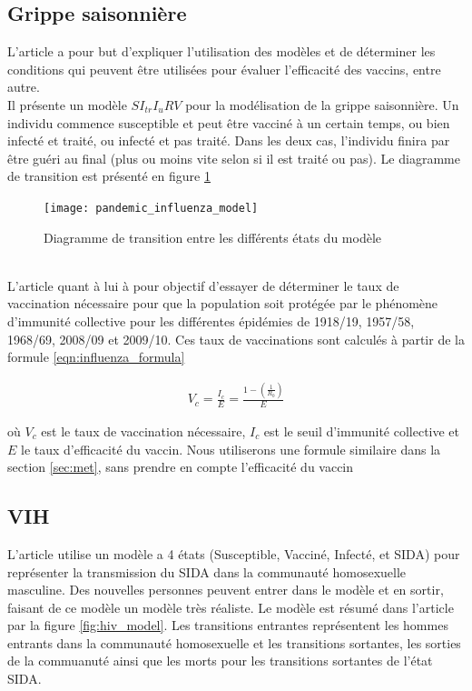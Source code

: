 \documentclass[journal, a4paper]{IEEEtran}
\begin{document}
	\subsection{Grippe saisonnière}
		L'article \cite{pandemic_influenza} a pour but d'expliquer l'utilisation des modèles et de déterminer les conditions qui peuvent être utilisées pour évaluer l'efficacité des vaccins, entre autre. \\
		Il présente un modèle $SI_{tr}I_uRV$ pour la modélisation de la grippe saisonnière. Un individu commence susceptible et peut être vacciné à un certain temps, ou bien infecté et traité, ou infecté et pas traité. Dans les deux cas, l'individu finira par être guéri au final (plus ou moins vite selon si il est traité ou pas). Le diagramme de transition est présenté en figure \ref{fig:pandemic_influenza_model}
		\begin{figure}[!hbt]
			\caption{Diagramme de transition entre les différents états du modèle}
			\texttt{[image: pandemic\_influenza\_model]}
			\label{fig:pandemic_influenza_model}
			\cite{pandemic_influenza}
		\end{figure} \\


		 L'article \cite{influenza_HIT} quant à lui à pour objectif d'essayer de déterminer le taux de vaccination nécessaire pour que la population soit protégée par le phénomène d'immunité collective pour les différentes épidémies de 1918/19, 1957/58, 1968/69, 2008/09 et 2009/10. Ces taux de vaccinations sont calculés à partir de la formule \ref{eqn:influenza_formula}

		 \begin{equation}
		 \label{eqn:influenza_formula}
		 	\begin{aligned}
		 		V_c = \frac{I_c}{E} = \frac{1-(\frac{1}{R_0})}{E}
		 	\end{aligned}
		 \end{equation}

		 où $V_c$ est le taux de vaccination nécessaire, $I_c$ est le seuil d'immunité collective et $E$ le taux d'efficacité du vaccin. Nous utiliserons une formule similaire dans la section \ref{sec:met}, sans prendre en compte l'efficacité du vaccin

	 \subsection{VIH}
	 L'article \cite{Imperfect_vaccines_and_herd_immunity_to_HIV_1993} utilise un modèle a 4 états (Susceptible, Vacciné, Infecté, et SIDA) pour représenter la transmission du SIDA dans la communauté homosexuelle masculine.
	 Des nouvelles personnes peuvent entrer dans le modèle et en sortir, faisant de ce modèle un modèle très réaliste. Le modèle est résumé dans l'article par la figure \ref{fig:hiv_model}. Les transitions entrantes représentent les hommes entrants dans la communauté homosexuelle et les transitions sortantes, les sorties de la commuanuté ainsi que les morts pour les transitions sortantes de l'état SIDA.
\end{document}
